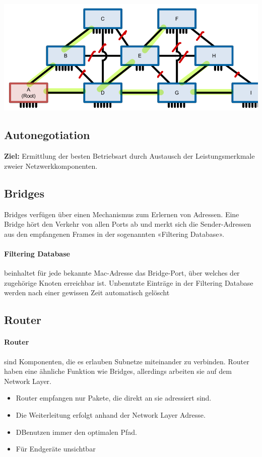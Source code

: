 \includegraphics[scale=.275]{img/spanning_tree.png}

\subsection{Autonegotiation}{
    \textbf{Ziel:}
    {Ermittlung der besten Betriebsart durch Austausch der
        Leistungsmerkmale zweier Netzwerkkomponenten.}
}

\subsection{Bridges}
{Bridges verfügen über einen Mechanismus zum Erlernen von Adressen. Eine Bridge hört den Verkehr von allen Ports ab und merkt sich die Sender-Adressen aus den
    empfangenen Frames in der sogenannten «Filtering Database».}
\paragraph{Filtering Database} beinhaltet für jede bekannte Mac-Adresse das Bridge-Port, über welches der zugehörige
Knoten erreichbar ist. Unbenutzte Einträge in der Filtering Database werden nach einer gewissen Zeit automatisch gelöscht
\columnbreak
\subsection{Router}

\paragraph{Router}  sind Komponenten, die es erlauben Subnetze miteinander zu verbinden. Router haben eine ähnliche Funktion wie Bridges, allerdings arbeiten sie auf dem
Network Layer.
    {
        \begin{itemize}[noitemsep]
            \item Router empfangen nur Pakete, die direkt an sie adressiert sind.
            \item Die Weiterleitung erfolgt anhand der Network Layer Adresse.
            \item DBenutzen immer den optimalen Pfad.
            \item  Für Endgeräte unsichtbar
        \end{itemize}
    }

